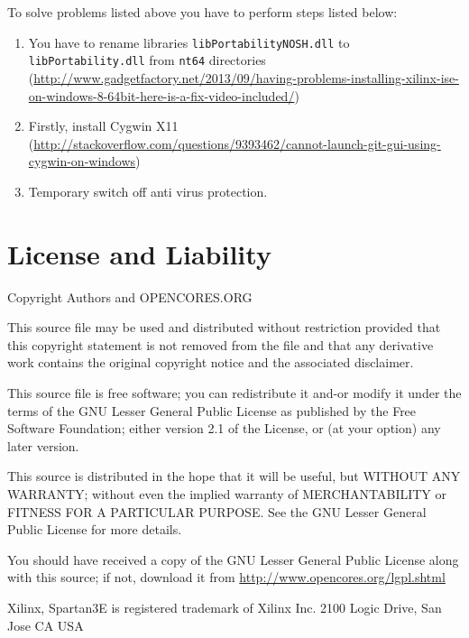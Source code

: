 \documentclass{gajewski}
\begin{document}
To solve problems listed above you have to perform steps listed below:
\begin{enumerate}
    \item You have to rename libraries \texttt{libPortabilityNOSH.dll} to \texttt{libPortability.dll} from \texttt{nt64} directories (\href{http://www.gadgetfactory.net/2013/09/having-problems-installing-xilinx-ise-on-windows-8-64bit-here-is-a-fix-video-included/}{http://www.gadgetfactory.net/2013/09/having-problems-installing-xilinx-ise-on-windows-8-64bit-here-is-a-fix-video-included/})
    \item Firstly, install Cygwin X11 (\href{http://stackoverflow.com/questions/9393462/cannot-launch-git-gui-using-cygwin-on-windows}{http://stackoverflow.com/questions/9393462/cannot-launch-git-gui-using-cygwin-on-windows})
    \item Temporary switch off anti virus protection.
\end{enumerate}

\newpage

\section{License and Liability}
Copyright\textcopyright {} Authors and OPENCORES.ORG

This source file may be used and distributed without
restriction provided that this copyright statement is not
removed from the file and that any derivative work contains
the original copyright notice and the associated disclaimer.

This source file is free software; you can redistribute it
and-or modify it under the terms of the GNU Lesser General
Public License as published by the Free Software Foundation;
either version 2.1 of the License, or (at your option) any
later version.

This source is distributed in the hope that it will be
useful, but WITHOUT ANY WARRANTY; without even the implied
warranty of MERCHANTABILITY or FITNESS FOR A PARTICULAR
PURPOSE. See the GNU Lesser General Public License for more
details.

You should have received a copy of the GNU Lesser General
Public License along with this source; if not, download it
from \href{http://www.opencores.org/lgpl.shtml}{http://www.opencores.org/lgpl.shtml}

Xilinx, Spartan3E is registered trademark of Xilinx Inc. 2100 Logic Drive, San Jose CA USA

\newpage


\end{document}
